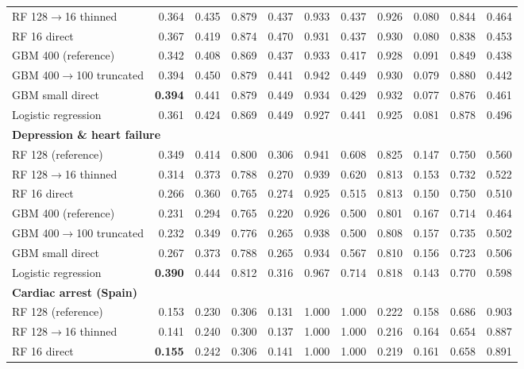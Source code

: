 {\begin{longtable}{lrrrrrrrrrr}
\quad RF 128$\rightarrow$16 thinned & 0.364 & 0.435 & 0.879 & 0.437 & 0.933 & 0.437 & 0.926 & 0.080 & 0.844 & 0.464 \\
\quad RF 16 direct & 0.367 & 0.419 & 0.874 & 0.470 & 0.931 & 0.437 & 0.930 & 0.080 & 0.838 & 0.453 \\
\quad GBM 400 (reference) & 0.342 & 0.408 & 0.869 & 0.437 & 0.933 & 0.417 & 0.928 & 0.091 & 0.849 & 0.438 \\
\quad GBM 400$\rightarrow$100 truncated & 0.394 & 0.450 & 0.879 & 0.441 & 0.942 & 0.449 & 0.930 & 0.079 & 0.880 & 0.442 \\
\quad GBM small direct & \textbf{0.394} & 0.441 & 0.879 & 0.449 & 0.934 & 0.429 & 0.932 & 0.077 & 0.876 & 0.461 \\
\quad Logistic regression & 0.361 & 0.424 & 0.869 & 0.449 & 0.927 & 0.441 & 0.925 & 0.081 & 0.878 & 0.496 \\
\midrule
\multicolumn{11}{l}{\textbf{Depression \& heart failure}} \\*
\quad RF 128 (reference) & 0.349 & 0.414 & 0.800 & 0.306 & 0.941 & 0.608 & 0.825 & 0.147 & 0.750 & 0.560 \\
\quad RF 128$\rightarrow$16 thinned & 0.314 & 0.373 & 0.788 & 0.270 & 0.939 & 0.620 & 0.813 & 0.153 & 0.732 & 0.522 \\
\quad RF 16 direct & 0.266 & 0.360 & 0.765 & 0.274 & 0.925 & 0.515 & 0.813 & 0.150 & 0.750 & 0.510 \\
\quad GBM 400 (reference) & 0.231 & 0.294 & 0.765 & 0.220 & 0.926 & 0.500 & 0.801 & 0.167 & 0.714 & 0.464 \\
\quad GBM 400$\rightarrow$100 truncated & 0.232 & 0.349 & 0.776 & 0.265 & 0.938 & 0.500 & 0.808 & 0.157 & 0.735 & 0.502 \\
\quad GBM small direct & 0.267 & 0.373 & 0.788 & 0.265 & 0.934 & 0.567 & 0.810 & 0.156 & 0.723 & 0.506 \\
\quad Logistic regression & \textbf{0.390} & 0.444 & 0.812 & 0.316 & 0.967 & 0.714 & 0.818 & 0.143 & 0.770 & 0.598 \\
\midrule
\multicolumn{11}{l}{\textbf{Cardiac arrest (Spain)}} \\*
\quad RF 128 (reference) & 0.153 & 0.230 & 0.306 & 0.131 & 1.000 & 1.000 & 0.222 & 0.158 & 0.686 & 0.903 \\
\quad RF 128$\rightarrow$16 thinned & 0.141 & 0.240 & 0.300 & 0.137 & 1.000 & 1.000 & 0.216 & 0.164 & 0.654 & 0.887 \\
\quad RF 16 direct & \textbf{0.155} & 0.242 & 0.306 & 0.141 & 1.000 & 1.000 & 0.219 & 0.161 & 0.658 & 0.891 \\

\end{longtable}}
